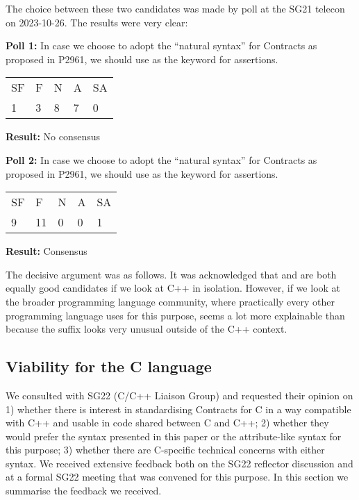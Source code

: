 The choice between these two candidates was made by poll at the SG21 telecon on 2023-10-26. The results were very clear:

\begin{adjustwidth}{0.5cm}{0.5cm}
\textbf{Poll 1:} In case we choose to adopt the ``natural syntax'' for Contracts as proposed in 
P2961, we should use  as the keyword for assertions.

\begin{tabular}{lllll}
SF & F & N & A & SA \\
1 & 3 & 8 & 7 & 0
\end{tabular}

\textbf{Result:} No consensus
\end{adjustwidth}

\begin{adjustwidth}{0.5cm}{0.5cm}
\textbf{Poll 2:} In case we choose to adopt the ``natural syntax'' for Contracts as proposed in 
P2961, we should use  as the keyword for assertions.

\begin{tabular}{lllll}
SF & F & N & A & SA \\
9 & 11 & 0 & 0 & 1
\end{tabular}

\textbf{Result:} Consensus
\end{adjustwidth}

The decisive argument was as follows. It was acknowledged that  and  are both equally good candidates if we look at C++ in isolation. However, if we look at the broader programming language community, where practically every other programming language uses  for this purpose,  seems a lot more explainable than  because the  suffix looks very unusual outside of the C++ context.


\subsection{Viability for the C language}
\label{subsec:clang}

We consulted with SG22 (C/C++ Liaison Group) and requested their opinion on 1) whether there is interest in standardising Contracts for C in a way compatible with C++ and usable in code shared between C and C++; 2) whether they would prefer the syntax presented in this paper or the attribute-like syntax \cite{P2935R3} for this purpose; 3) whether there are C-specific technical concerns with either syntax. We received extensive feedback both on the SG22 reflector discussion and at a formal SG22 meeting that was convened for this purpose. In this section we summarise the feedback we received.

